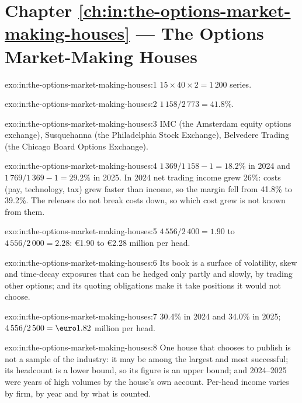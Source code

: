 \section*{Chapter \ref{ch:in:the-options-market-making-houses} --- The Options Market-Making Houses}

\begin{solution}{exo:in:the-options-market-making-houses:1}
$15\times40\times2=1\,200$ series.
\end{solution}

\begin{solution}{exo:in:the-options-market-making-houses:2}
$1\,158/2\,773=41.8\%$.
\end{solution}

\begin{solution}{exo:in:the-options-market-making-houses:3}
IMC (the Amsterdam equity options exchange), Susquehanna (the Philadelphia Stock Exchange), Belvedere Trading (the
Chicago Board Options Exchange).
\end{solution}

\begin{solution}{exo:in:the-options-market-making-houses:4}
$1\,369/1\,158-1=18.2\%$ in 2024 and $1\,769/1\,369-1=29.2\%$ in 2025. In 2024 net trading income grew 26\%: costs
(pay, technology, tax) grew faster than income, so the margin fell from 41.8\% to 39.2\%. The releases do not break
costs down, so which cost grew is not known from them.
\end{solution}

\begin{solution}{exo:in:the-options-market-making-houses:5}
$4\,556/2\,400=1.90$ to $4\,556/2\,000=2.28$: \euro1.90 to \euro2.28 million per head.
\end{solution}

\begin{solution}{exo:in:the-options-market-making-houses:6}
Its book is a surface of volatility, skew and time-decay exposures that can be hedged only partly and slowly, by
trading other options; and its quoting obligations make it take positions it would not choose.
\end{solution}

\begin{solution}{exo:in:the-options-market-making-houses:7}
30.4\% in 2024 and 34.0\% in 2025; $4\,556/2\,500=\text{\euro}1.82$ million per head.
\end{solution}

\begin{solution}{exo:in:the-options-market-making-houses:8}
One house that chooses to publish is not a sample of the industry: it may be among the largest and most successful;
its headcount is a lower bound, so its figure is an upper bound; and 2024--2025 were years of high volumes by the
house's own account. Per-head income varies by firm, by year and by what is counted.
\end{solution}

